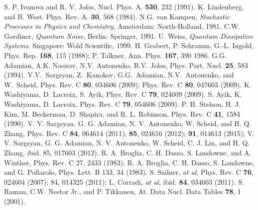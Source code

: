 \documentclass[preprint,review,12pt]{elsarticle}
\begin{document}
\begin{thebibliography}{99}
                      S. P. Ivanova and R. V. Jolos, Nucl. Phys. A. {\bf 530}, 232 (1991).
       K. Lindenberg,  and B. West. Phys. Rev. A. {\bf 30}, 568 (1984).
      N.G. van Kampen, {\it Stochastic Processes in Physics and Chemistry}, Amsterdam: North-Holland, 1981.
    C.W. Gardiner, {\it Quantum Noise}, Berlin: Springer, 1991.
       U. Weiss, {\it Quantum Dissipative Systems}. Singapore: Wold Scientific, 1999.
     H. Grabert, P. Schramm, G.-L. Ingold, Phys. Rep. {\bf 168}, 115 (1988); P. Talkner, Ann. Phys. {\bf 167}, 390 1986.
        G.G. Adamian, A.K. Nasirov, N.V. Antonenko, R.V. Jolos, Phys. Part. Nucl. {\bf 25}, 583 (1994).
        V.V.~Sargsyan, Z.~Kanokov, G.G.~Adamian, N.V.~Antonenko, and W.~Scheid,
                      Phys. Rev. C {\bf 80}, 034606 (2009); Phys. Rev. C {\bf 80}, 047603 (2009).
        K. Washiyama, D. Lacroix, S. Ayik, Phys. Rev. C {\bf 79}, 024609 (2009).
       S. Ayik, K. Washiyama, D. Lacroix, Phys. Rev. C {\bf 79}, 054606 (2009).
     P. H. Stelson, H. J. Kim, M. Beckerman, D. Shapira, and R. L. Robinson, Phys. Rev. C {\bf 41}, 1584 (1990).
    V. V. Sargsyan, G. G. Adamian, N. V. Antonenko, W. Scheid, and H. Q. Zhang, Phys. Rev. C {\bf 84}, 064614 (2011);
                      {\bf 85}, 024616 (2012); {\bf 91}, 014613 (2015);
                      V. V. Sargsyan, G. G. Adamian, N. V. Antonenko, W. Scheid, C. J. Lin, and H. Q. Zhang, ibid. 85, 017603 (2012).
     R. A. Broglia, C. H. Dasso, S. Landowne, and A. Winther, Phys. Rev. C 27, 2433 (1983); R. A. Broglia, C. H. Dasso,
                      S. Landowne, and G. Pollarolo, Phys. Lett. B 133, 34 (1983).
     S. Szilner, {\it at al}, Phys. Rev. C {\bf 76}, 024604 (2007); 84, 014325 (2011);
                      L. Corradi, {\it at al}, ibid. {\bf 84}, 034603 (2011).
       S. Raman, C.W. Nestor Jr., and P. Tikkanen, At. Data Nucl. Data Tables {\bf 78}, 1 (2001).

\end{thebibliography}
\end{document}

